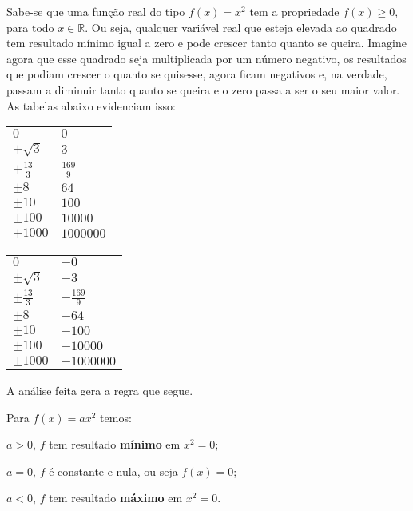 Sabe-se que uma função real do tipo \(f(x)=x^2\) tem a propriedade \(f(x) \geq 0\), para todo \(x \in \mathbb{R}\). Ou seja, qualquer variável real que esteja elevada ao quadrado tem resultado mínimo igual a zero e pode crescer tanto quanto se queira. Imagine agora que esse quadrado seja multiplicada por um número negativo, os resultados que podiam crescer o quanto se quisesse, agora ficam negativos e, na verdade, passam a diminuir tanto quanto se queira e o zero passa a ser o seu maior valor. As tabelas abaixo evidenciam isso:

\begin{multicols}{2}
\begin{table}[H]
\raggedleft
\begin{tabular}{|e{4em}|e{4em}|}
\hline
{} &  \\
\hline
$0$ & $0$ \\
\hline
$\pm\sqrt{3}$ & $3$ \\
\hline
$\displaystyle\pm\frac{13}{3}$ & $\displaystyle\frac{169}{9}$ \\
\hline
$\pm8$ & $64$ \\
\hline
$\pm10$ & $100$ \\
\hline
$\pm100$ & $10000$ \\
\hline
$\pm1000$ & $1000000$ \\
\hline
\end{tabular}
\end{table}
\columnbreak
\begin{table}[H]
\raggedright
\begin{tabular}{|e{4em}|e{4em}|}
\hline
{} &  \\
\hline
$0$ & $-0$ \\
\hline
$\pm\sqrt{3}$ & $-3$ \\
\hline
$\displaystyle\pm\frac{13}{3}$ & $\displaystyle-\frac{169}{9}$ \\
\hline
$\pm8$ & $-64$ \\
\hline
$\pm10$ & $-100$ \\
\hline
$\pm100$ & $-10000$ \\
\hline
$\pm1000$ & $-1000000$ \\
\hline
\end{tabular}
\end{table}
\end{multicols}
\needspace{10em}
A análise feita gera a regra que segue.

\begin{observation}

Para \(f(x)=ax^2\) temos:

\(a > 0\), \(f\) tem resultado \textbf{mínimo} em \(x^2 = 0\);

\(a = 0\), \(f\) é constante e nula, ou seja \(f(x)=0\);

\(a < 0\), \(f\) tem resultado \textbf{máximo} em \(x^2 = 0\).
\end{observation}

